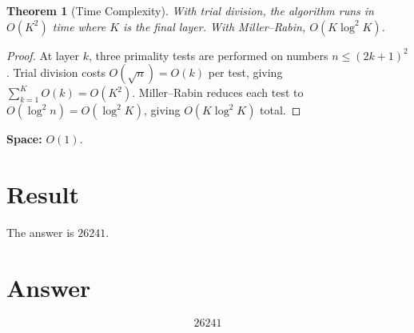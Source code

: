 \documentclass[12pt,a4paper]{article}
\newtheorem{theorem}{Theorem}
\theoremstyle{definition}
\theoremstyle{remark}
\begin{document}
\begin{theorem}[Time Complexity]
With trial division, the algorithm runs in $O(K^2)$ time where $K$ is the final layer. With Miller--Rabin, $O(K \log^2 K)$.
\end{theorem}

\begin{proof}
At layer $k$, three primality tests are performed on numbers $n \leq (2k+1)^2$. Trial division costs $O(\sqrt{n}) = O(k)$ per test, giving $\sum_{k=1}^K O(k) = O(K^2)$. Miller--Rabin reduces each test to $O(\log^2 n) = O(\log^2 K)$, giving $O(K \log^2 K)$ total.
\end{proof}

\noindent\textbf{Space:} $O(1)$.

\section{Result}
The answer is $\boxed{26241}$.

\section{Answer}

\[
\boxed{26241}
\]
\end{document}
